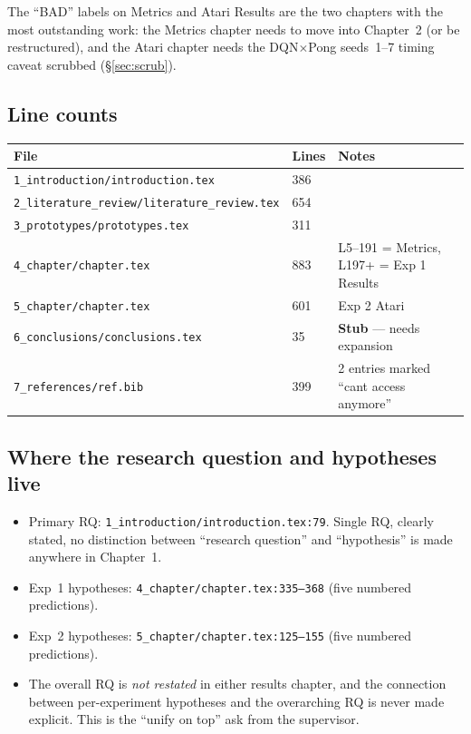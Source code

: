\documentclass[11pt,a4paper]{article}
\newcommand{\fileline}[1]{\texttt{\small #1}}
\begin{document}
The ``BAD'' labels on Metrics and Atari Results are the two chapters with the
most outstanding work: the Metrics chapter needs to move into Chapter~2 (or
be restructured), and the Atari chapter needs the DQN$\times$Pong seeds~1--7
timing caveat scrubbed (\S\ref{sec:scrub}).

\subsection*{Line counts}

\begin{tabular}{lll}
\toprule
File & Lines & Notes \\
\midrule
\fileline{1\_introduction/introduction.tex}      & 386 & \\
\fileline{2\_literature\_review/literature\_review.tex} & 654 & \\
\fileline{3\_prototypes/prototypes.tex}          & 311 & \\
\fileline{4\_chapter/chapter.tex}                & 883 & L5--191 = Metrics, L197+ = Exp 1 Results \\
\fileline{5\_chapter/chapter.tex}                & 601 & Exp 2 Atari \\
\fileline{6\_conclusions/conclusions.tex}        &  35 & \textbf{Stub} --- needs expansion \\
\fileline{7\_references/ref.bib}                 & 399 & 2 entries marked ``cant access anymore'' \\
\bottomrule
\end{tabular}

\subsection*{Where the research question and hypotheses live}

\begin{itemize}[leftmargin=*]
  \item Primary RQ:
  \fileline{1\_introduction/introduction.tex:79}.
  Single RQ, clearly stated, no distinction between ``research question'' and
  ``hypothesis'' is made anywhere in Chapter~1.
  \item Exp~1 hypotheses: \fileline{4\_chapter/chapter.tex:335--368}
  (five numbered predictions).
  \item Exp~2 hypotheses: \fileline{5\_chapter/chapter.tex:125--155}
  (five numbered predictions).
  \item The overall RQ is \emph{not restated} in either results chapter, and
  the connection between per-experiment hypotheses and the overarching RQ is
  never made explicit. This is the ``unify on top'' ask from the supervisor.
\end{itemize}
\end{document}
